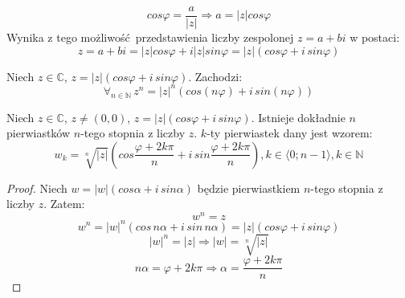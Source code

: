 \begin{equation*}
    cos \varphi = \frac{a}{\mathopen|z\mathclose|} \Longrightarrow a = \mathopen|z\mathclose| cos \varphi
\end{equation*}
Wynika z tego możliwość przedstawienia liczby zespolonej $z = a + bi$ w postaci:
\begin{equation*}
    z = a + bi = \mathopen|z\mathclose| cos \varphi + i \mathopen|z\mathclose| sin \varphi = \mathopen|z\mathclose|(cos \varphi + i\, sin \varphi)
\end{equation*}
\begin{theorem}
    Niech $z \in \mathds{C}$, $z = \mathopen|z\mathclose|(cos \varphi + i\, sin \varphi)$. Zachodzi:
    \begin{equation*}
        \forall_{n \in \mathds{N}} \, z^n = {\mathopen|z\mathclose|}^n (cos(n\varphi) + i\, sin(n\varphi))
    \end{equation*}
\end{theorem}
\begin{theorem}
    Niech $z \in \mathds{C}$, $z \neq (0,0)$, $z = \mathopen|z\mathclose|(cos\varphi + i\, sin\varphi)$.
    Istnieje dokładnie $n$ pierwiastków $n$-tego stopnia z liczby $z$. $k$-ty pierwiastek dany jest wzorem:
    \begin{equation*}
        w_k = \sqrt[n]{\mathopen|z\mathclose|}\left(cos\frac{\varphi+2k\pi}{n} + i\, sin \frac{\varphi+2k\pi}{n}\right), k \in \langle0; n-1 \rangle, k \in \mathds{N}
    \end{equation*}
    \begin{proof}
        Niech $w = \mathopen|w\mathclose|(cos \alpha + i\, sin \alpha)$ będzie pierwiastkiem $n$-tego stopnia z liczby $z$. Zatem:
        \begin{equation*}
            w^n = z
        \end{equation*}
        \begin{equation*}
            w^n = {\mathopen|w\mathclose|}^n(cos\, n\alpha + i\, sin\, n\alpha) = \mathopen|z\mathclose|(cos\varphi + i\, sin\varphi)
        \end{equation*}
        \begin{equation*}
            {\mathopen|w\mathclose|}^n = \mathopen|z\mathclose| \Longrightarrow \mathopen|w\mathclose| = \sqrt[n]{\mathopen|z\mathclose|}
        \end{equation*}
        \begin{equation*}
            n\alpha = \varphi+2k\pi \Longrightarrow \alpha = \frac{\varphi+2k\pi}{n}
        \end{equation*}
    \end{proof}
\end{theorem}
